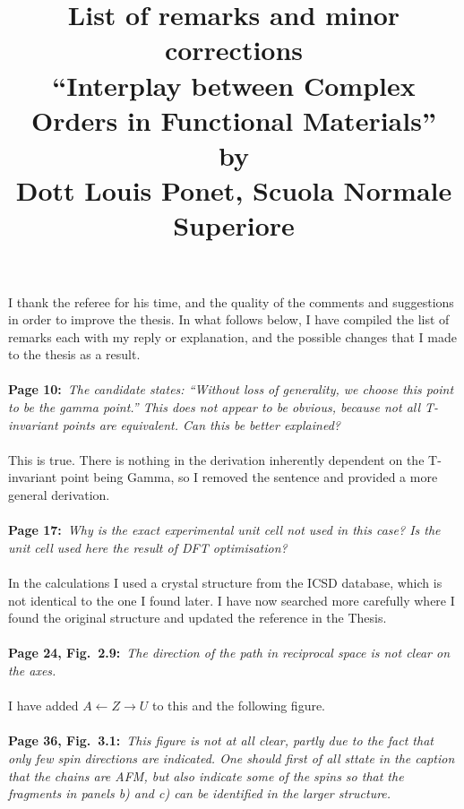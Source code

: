 \documentclass[a4, UTF8]{article}
\begin{document}
\title{List of remarks and minor corrections\\
\large ``Interplay between Complex Orders in Functional Materials''\\
by\\
Dott Louis Ponet, Scuola Normale Superiore}
\date{}
\maketitle
I thank the referee for his time, and the quality of the comments and suggestions in order to improve the thesis.
In what follows below, I have compiled the list of remarks each with my reply or explanation, and the possible changes that I made to the thesis as a result.
\\\\
{\bf Page 10:}~{\it The candidate states: ``Without loss of generality, we choose this point to be the gamma point.'' This does not appear to be obvious, because not all T-invariant points are equivalent. Can this be better explained?}
\\\\
This is true. There is nothing in the derivation inherently dependent on the T-invariant point being Gamma, so I removed the sentence and provided a more general derivation.
\\\\
{\bf Page 17:}~{\it Why is the exact experimental unit cell not used in this case? Is the unit cell used here the result of DFT optimisation?}
\\\\
In the calculations I used a crystal structure from the ICSD database, which is not identical to the one I found later. I have now searched more carefully where I found the original structure and updated the reference in the Thesis. 
\\\\
{\bf Page 24, Fig.~2.9:}~{\it The direction of the path in reciprocal space is not clear on the axes.}
\\\\
I have added $A \leftarrow Z \rightarrow U$ to this and the following figure.
\\\\
{\bf Page 36, Fig.~3.1:}~{\it This figure is not at all clear, partly due to the fact that only few spin directions are indicated. One should first of all sttate in the caption that the chains are AFM, but also indicate some of the spins so that the fragments in panels b) and c) can be identified in the larger structure.}
\end{document}
